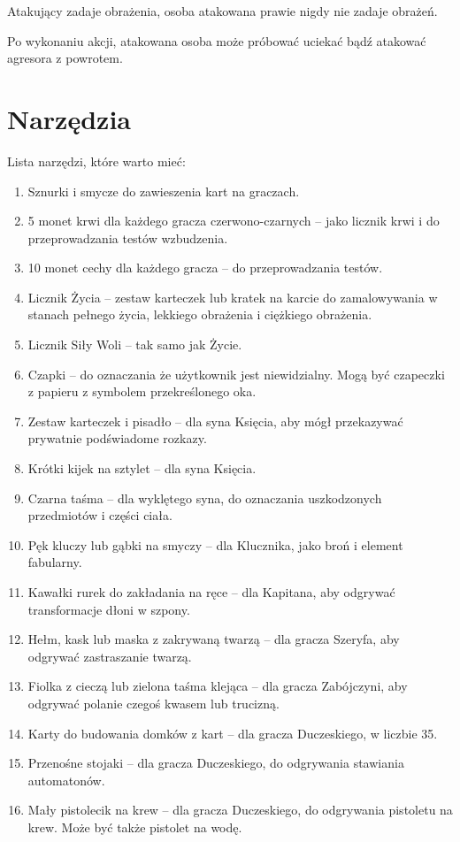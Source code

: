	Atakujący zadaje obrażenia, osoba atakowana prawie nigdy nie zadaje obrażeń.
	
	Po wykonaniu akcji, atakowana osoba może próbować uciekać bądź atakować agresora z powrotem.

\section{Narzędzia}
	Lista narzędzi, które warto mieć:
	\begin{enumerate}
		\item Sznurki i smycze do zawieszenia kart na graczach.
		\item 5 monet krwi dla każdego gracza czerwono-czarnych -- jako licznik krwi i do przeprowadzania testów wzbudzenia.
		\item 10 monet cechy dla każdego gracza -- do przeprowadzania testów.
		\item Licznik Życia -- zestaw karteczek lub kratek na karcie do zamalowywania w stanach pełnego życia, lekkiego obrażenia i ciężkiego obrażenia.
		\item Licznik Siły Woli -- tak samo jak Życie.
		\item Czapki -- do oznaczania że użytkownik jest niewidzialny. Mogą być czapeczki z papieru z symbolem przekreślonego oka.
		\item Zestaw karteczek i pisadło -- dla syna Księcia, aby mógł przekazywać prywatnie podświadome rozkazy.
		\item Krótki kijek na sztylet -- dla syna Księcia.
		\item Czarna taśma -- dla wyklętego syna, do oznaczania uszkodzonych przedmiotów i części ciała.
		\item Pęk kluczy lub gąbki na smyczy -- dla Klucznika, jako broń i element fabularny.
		\item Kawałki rurek do zakładania na ręce -- dla Kapitana, aby odgrywać transformacje dłoni w szpony.
		\item Hełm, kask lub maska z zakrywaną twarzą -- dla gracza Szeryfa, aby odgrywać zastraszanie twarzą.
		\item Fiolka z cieczą lub zielona taśma klejąca -- dla gracza Zabójczyni, aby odgrywać polanie czegoś kwasem lub trucizną.
		\item Karty do budowania domków z kart -- dla gracza Duczeskiego, w liczbie 35.
		\item Przenośne stojaki -- dla gracza Duczeskiego, do odgrywania stawiania automatonów.
		\item Mały pistolecik na krew -- dla gracza Duczeskiego, do odgrywania pistoletu na krew. Może być także pistolet na wodę.

\end{enumerate}
